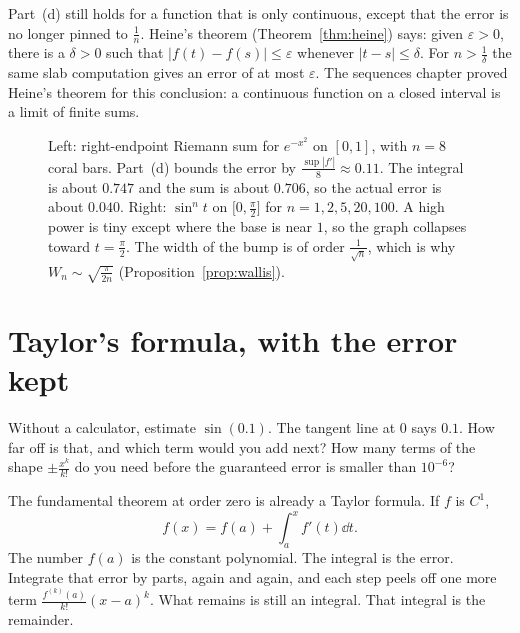Part~(d) still holds for a function that is only continuous, except that the error is no longer pinned to $\frac1n$. Heine's theorem (Theorem~\ref{thm:heine}) says: given $\varepsilon>0$, there is a $\delta>0$ such that $|f(t)-f(s)|\le\varepsilon$ whenever $|t-s|\le\delta$. For $n>\frac1\delta$ the same slab computation gives an error of at most $\varepsilon$. The sequences chapter proved Heine's theorem for this conclusion: a continuous function on a closed interval is a limit of finite sums.

\begin{figure}[ht]
\centering
{}
\caption{Left: right-endpoint Riemann sum for $e^{-x^2}$ on $[0,1]$, with $n=8$ coral bars. Part~(d) bounds the error by $\frac{\sup|f'|}8\approx0.11$. The integral is about $0.747$ and the sum is about $0.706$, so the actual error is about $0.040$. Right: $\sin^nt$ on $\bigl[0,\frac\pi2\bigr]$ for $n=1,2,5,20,100$. A high power is tiny except where the base is near $1$, so the graph collapses toward $t=\frac\pi2$. The width of the bump is of order $\frac1{\sqrt n}$, which is why $W_n\sim\sqrt{\frac\pi{2n}}$ (Proposition~\ref{prop:wallis}).}
\label{fig:riemannsum}
\end{figure}

\section{Taylor's formula, with the error kept}

\begin{think}
Without a calculator, estimate $\sin(0.1)$. The tangent line at $0$ says $0.1$. How far off is that, and which term would you add next? How many terms of the shape $\pm\frac{x^k}{k!}$ do you need before the guaranteed error is smaller than $10^{-6}$?
\end{think}

The fundamental theorem at order zero is already a Taylor formula. If $f$ is $C^1$,
\[
f(x)=f(a)+\int_a^x f'(t)\dd t.
\]
The number $f(a)$ is the constant polynomial. The integral is the error. Integrate that error by parts, again and again, and each step peels off one more term $\frac{f^{(k)}(a)}{k!}(x-a)^k$. What remains is still an integral. That integral is the remainder.

